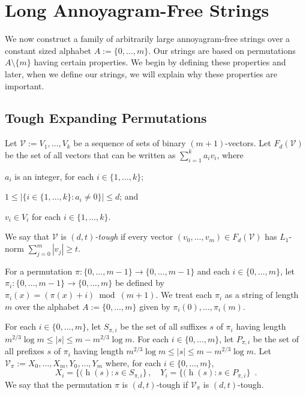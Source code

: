 \documentclass[kpfonts]{patmorin}
\DeclareMathOperator{\hist}{h}
\begin{document}
\section{Long Annoyagram-Free Strings}

We now construct a family of arbitrarily large annoyagram-free strings over a constant sized alphabet $A:=\{0,\ldots,m\}$.
Our strings are based on permutations $A\setminus\{m\}$ having certain properties.  We begin by defining these properties and later, when we define our strings, we will explain why these properties are important.

\subsection{Tough Expanding Permutations}
\label{permutations}

Let $\mathcal{V}:=V_1,\ldots,V_k$ be a sequence of sets of binary $(m+1)$-vectors.  Let $F_d(\mathcal{V})$ be the set of all vectors that can be written as $\sum_{i=1}^k a_iv_i$, where
\begin{compactenum}
    \item $a_i$ is an integer, for each $i\in\{1,\ldots,k\}$;
    \item $1\le |\{i\in\{1,\ldots,k\}:a_i\neq 0\}| \le d$; and
    \item $v_i\in V_i$ for each $i\in\{1,\ldots,k\}$.
\end{compactenum}
We say that $\mathcal{V}$ is \emph{$(d,t)$-tough} if every vector $(v_0,\ldots,v_m)\in F_d(\mathcal{V})$ has $L_1$-norm $\sum_{j=0}^m |v_j| \ge t$.

For a permutation $\pi:\{0,\ldots,m-1\}\to\{0,\ldots,m-1\}$ and each $i\in\{0,\ldots,m\}$, let $\pi_i:\{0,\ldots,m-1\}\to\{0,\ldots,m\}$ be defined by $\pi_i(x)=(\pi(x)+i)\bmod (m+1)$.  We treat each $\pi_i$ as a string of length $m$ over the alphabet $A:=\{0,\ldots,m\}$ given by $\pi_i(0),\ldots,\pi_i(m)$.

For each $i\in\{0,\ldots,m\}$, let $S_{\pi,i}$ be the set of all suffixes $s$ of $\pi_i$ having length $m^{2/3}\log m \le |s|\le m-m^{2/3}\log m$.  For each $i\in\{0,\ldots,m\}$, let $P_{\pi,i}$ be the set of all prefixes $s$ of $\pi_i$ having length $m^{2/3}\log m \le |s|\le m-m^{2/3}\log m$.
Let $\mathcal{V}_{\pi}:=X_0,\ldots,X_m,Y_0,\ldots,Y_m$ where, for each $i\in\{0,\ldots,m\}$,
\[
    X_i=\{(\hist(s) : s\in S_{\pi,i}\}\,, \quad
    Y_i=\{(\hist(s) : s\in P_{\pi,i}\} \enspace .
\]
We say that the permutation $\pi$ is $(d,t)$-tough if $\mathcal{V}_{\pi}$ is $(d,t)$-tough.
\end{document}
